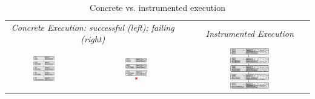 \begin{table}[t!]
\centering 
{\scriptsize \begin{tabular}{@{}c@{}ccc@{}c@{}}\toprule
\multicolumn{3}{c}{{\it Concrete Execution: successful (left); failing (right)}} & &  \emph{Instrumented Execution}  \\
\cmidrule{1-3} \cmidrule{5-5}
{\includegraphics[width=0.305\textwidth,valign=T]{figures/conc_exec.png}} & & 
{\includegraphics[width=0.265\textwidth,valign=T]{figures/conc_wrong_exec.png}} & & 
{\includegraphics[width=0.347\textwidth,valign=T]{figures/inst_exec.png}}  \\  
\bottomrule
\end{tabular}}
\vspace{2pt}
\caption{Concrete vs. instrumented execution\label{example:symb:states:vs:assertions}}
\vspace*{-0.9cm}
\end{table}

